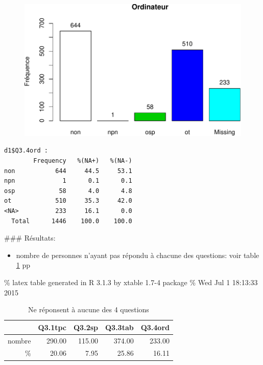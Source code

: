\documentclass[]{article}
\begin{document}
\begin{figure}[htbp]
\centering
\includegraphics{qs_etudiants_files/figure-latex/outils-4.pdf}
\end{figure}

\begin{verbatim}
d1$Q3.4ord : 
        Frequency   %(NA+)   %(NA-)
non           644     44.5     53.1
npn             1      0.1      0.1
osp            58      4.0      4.8
ot            510     35.3     42.0
<NA>          233     16.1      0.0
  Total      1446    100.0    100.0
\end{verbatim}

\#\#\# Résultats:

\begin{itemize}
\itemsep1pt\parskip0pt
\item
  nombre de personnes n'ayant pas répondu à chacune des questions: voir
  table \ref{lab.tnr} pp \pageref{lab.tnr}
\end{itemize}

\% latex table generated in R 3.1.3 by xtable 1.7-4 package \% Wed Jul 1
18:13:33 2015

\begin{table}[ht]
\centering
\begin{tabular}{rrrrr}
  \hline
 & Q3.1tpc & Q3.2sp & Q3.3tab & Q3.4ord \\ 
  \hline
nombre & 290.00 & 115.00 & 374.00 & 233.00 \\ 
   \%  & 20.06 & 7.95 & 25.86 & 16.11 \\ 
   \hline
\end{tabular}
\caption{Ne réponsent à aucune des 4 questions} 
\label{lab.tnr}
\end{table}
\end{document}
